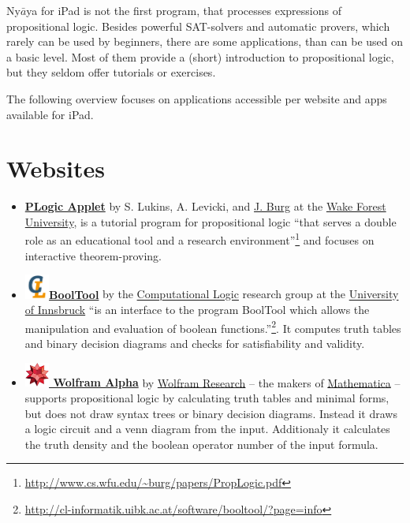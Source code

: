 
Ny$\bar{a}$ya for iPad is not the first program,  that processes expressions of propositional logic. 
Besides powerful SAT-solvers and automatic provers, which rarely can be used by beginners,
there are some applications, than can be used on a basic level.  
Most of them provide a (short) introduction to propositional logic, but they seldom offer tutorials or exercises. 	

The following overview focuses on applications accessible
per website and apps available for iPad.

\section{Websites}

\begin{itemize}
\item 
\href{http://www.cs.wfu.edu/~burg/JavaPackages/indexswingnet.html}{\bf PLogic Applet} 
by S. Lukins, A. Levicki, and 
\href{http://www.cs.wfu.edu/~burg}{J. Burg} at the
\href{http://www.cs.wfu.edu}{Wake Forest University}, is a
tutorial program for propositional logic 
“that serves a double role as an educational tool and a research environment”\footnote {
\url{http://www.cs.wfu.edu/~burg/papers/PropLogic.pdf}} and focuses 
 on interactive theorem-proving.

\item
\href{http://cl-informatik.uibk.ac.at/software/booltool/}{\bf 
\includegraphics[width=0.8cm]{clshortlogo_new.pdf}BoolTool} 
by the 
\href{http://cl-informatik.uibk.ac.at/}{Computational Logic} 
research group at the 
\href{http://informatik.uibk.ac.at}{University of Innsbruck}
“is an interface to the program BoolTool which allows the manipulation and evaluation of boolean functions.”\footnote{
\url{http://cl-informatik.uibk.ac.at/software/booltool/?page=info}}. 
It computes truth tables and binary decision diagrams and checks for satisfiability and validity.

\item
\href{http://www.wolframalpha.com/input/?i=a+or+b+and+c}{\bf 
\includegraphics[width=0.8cm]{related/WolframAlpha.jpg} Wolfram Alpha} 
by 
\href{http://www.wolfram.com/}{Wolfram Research} – the makers of 
\href{http://www.wolfram.com/mathematica/}{Mathematica} – supports
propositional logic by calculating truth tables and minimal forms, 
but does not draw syntax trees or binary decision diagrams.
Instead it draws a logic circuit and a venn diagram from the input. 
Additionaly it calculates the truth density
and the boolean operator number of the input formula. 


\end{itemize}
